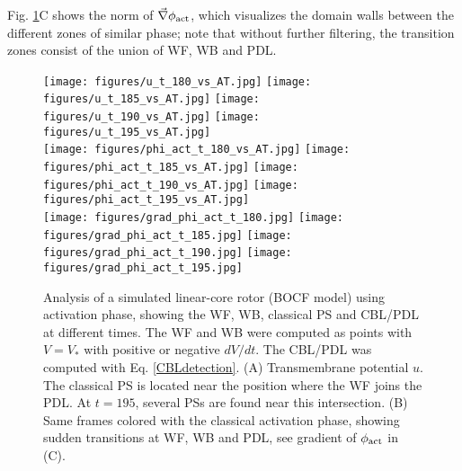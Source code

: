 \documentclass[aps,pre,amsfonts,amssymb,amsmath,twocolumn, superscriptaddress]{revtex4-1}
\newcommand{\phiact}{\ensuremath{\phi_{\rm act}}}
\newcommand{\VS}{V_*}
\newcommand{\figrevisit}{3.2cm}
\begin{document}


Fig. \ref{fig:S1S2revisited}C shows the norm of $\vec \nabla \phiact$, which visualizes the domain walls between the different zones of similar phase; note that without further filtering, the transition zones consist of the union of WF, WB and PDL.  

\begin{figure*}
    \centering
    \texttt{[image: figures/u\_t\_180\_vs\_AT.jpg]}
    \texttt{[image: figures/u\_t\_185\_vs\_AT.jpg]}
    \texttt{[image: figures/u\_t\_190\_vs\_AT.jpg]}
    \texttt{[image: figures/u\_t\_195\_vs\_AT.jpg]} \\
    
       \texttt{[image: figures/phi\_act\_t\_180\_vs\_AT.jpg]}
    \texttt{[image: figures/phi\_act\_t\_185\_vs\_AT.jpg]}
    \texttt{[image: figures/phi\_act\_t\_190\_vs\_AT.jpg]}
    \texttt{[image: figures/phi\_act\_t\_195\_vs\_AT.jpg]} \\
    
    \texttt{[image: figures/grad\_phi\_act\_t\_180.jpg]}
    \texttt{[image: figures/grad\_phi\_act\_t\_185.jpg]}
    \texttt{[image: figures/grad\_phi\_act\_t\_190.jpg]}
    \texttt{[image: figures/grad\_phi\_act\_t\_195.jpg]}\\
        \caption{Analysis of a simulated linear-core rotor (BOCF model) using activation phase, showing the WF, WB, classical PS and CBL/PDL at different times. The WF and WB were computed as points with $V=\VS$ with positive or negative $dV/dt$. The CBL/PDL was  computed with Eq. \eqref{CBLdetection}.
        (A) Transmembrane potential $u$. The classical PS is located near the position where the WF joins the PDL. At $t=195$, several PSs are found near this intersection.  
        (B) Same frames colored with the classical activation phase, showing sudden transitions at WF, WB and PDL, see gradient of $\phiact$ in (C). }
    \label{fig:S1S2revisited}
\end{figure*}
\end{document}
